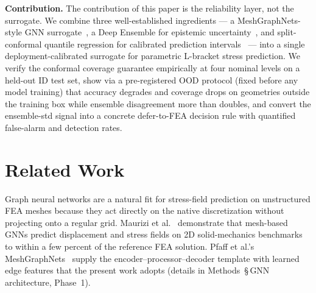 \documentclass[11pt]{article}
\begin{document}
\textbf{Contribution.} The contribution of this paper is the reliability
layer, not the surrogate. We combine three well-established ingredients ---
a MeshGraphNets-style GNN surrogate~\cite{pfaff2021meshgraphnets,
maurizi2022gnn}, a Deep Ensemble for epistemic
uncertainty~\cite{lakshminarayanan2017ensembles}, and split-conformal
quantile regression for calibrated prediction
intervals~\cite{romano2019cqr, angelopoulos2023conformal,
gopakumar2024conformal} --- into a single deployment-calibrated surrogate
for parametric L-bracket stress prediction. We verify the conformal
coverage guarantee empirically at four nominal levels on a held-out ID
test set, show via a pre-registered OOD protocol (fixed before any model
training) that accuracy degrades and coverage drops on geometries outside
the training box while ensemble disagreement more than doubles, and convert
the ensemble-std signal into a concrete defer-to-FEA decision rule with
quantified false-alarm and detection rates.

\section{Related Work}

Graph neural networks are a natural fit for stress-field prediction on
unstructured FEA meshes because they act directly on the native
discretization without projecting onto a regular grid. Maurizi et
al.~\cite{maurizi2022gnn} demonstrate that mesh-based GNNs predict
displacement and stress fields on 2D solid-mechanics benchmarks to within a
few percent of the reference FEA solution. Pfaff et al.'s
MeshGraphNets~\cite{pfaff2021meshgraphnets} supply the
encoder--processor--decoder template with learned edge features that the
present work adopts (details in Methods~\S\,GNN architecture, Phase~1).
\end{document}
